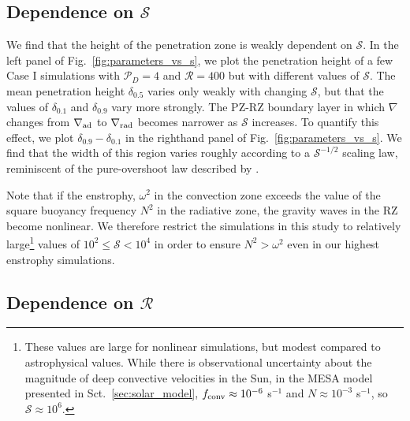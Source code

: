 \documentclass[twocolumn, linenumbers]{aastex631}
\newcommand{\gradrad}{\ensuremath{\nabla_{\rm{rad}}}}
\newcommand{\gradad}{\ensuremath{\nabla_{\rm{ad}}}}
\newcommand{\justgrad}{\ensuremath{\nabla}}
\newcommand{\mP}{\ensuremath{\mathcal{P}}}
\newcommand{\mR}{\ensuremath{\mathcal{R}}}
\newcommand{\mS}{\ensuremath{\mathcal{S}}}
\newcommand{\editone}[1]{#1}
\begin{document}
\subsection{Dependence on $\mS$}

We find that the height of the penetration zone is weakly dependent on $\mS$.
In the left panel of Fig.~\ref{fig:parameters_vs_s}, we plot the penetration height of a few Case I simulations with $\mP_D = 4$ and $\mR = 400$ but with different values of $\mS$.
The mean penetration height $\delta_{0.5}$ varies only weakly with changing $\mS$, but that the values of $\delta_{0.1}$ and $\delta_{0.9}$ vary more strongly.
The \editone{PZ-RZ boundary layer} in which $\justgrad$ changes from $\gradad$ to $\gradrad$ becomes narrower as $\mS$ increases.
To quantify this effect, we plot $\delta_{0.9} - \delta_{0.1}$ in the righthand panel of Fig.~\ref{fig:parameters_vs_s}.
We find that the width of this region varies roughly according to a $\mS^{-1/2}$ scaling law, reminiscent of the pure-overshoot law described by \citet{korre_etal_2019}.

Note that if the enstrophy, $\omega^2$ in the convection zone exceeds the value of the square buoyancy frequency $N^2$ in the radiative zone, the gravity waves in the RZ become nonlinear.
We therefore restrict the simulations in this study to relatively large\footnote{These values are large for nonlinear simulations, but modest compared to astrophysical values. \editone{While there is observational uncertainty about the magnitude of deep convective velocities in the Sun, in the MESA model presented in Sct.~\ref{sec:solar_model}, $f_{\rm{conv}} \approx 10^{-6}$ s$^{-1}$ and $N \approx 10^{-3}$ s$^{-1}$, so $\mS \approx 10^6$.}} values of $10^{2} \leq \mS < 10^4$ in order to ensure $N^2 > \omega^2$ even in our highest enstrophy simulations.



\subsection{Dependence on $\mR$}
\end{document}
